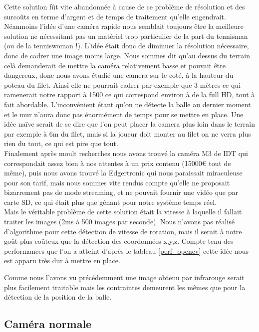 Cette solution fût vite abandonnée à cause de ce problème de résolution et des surcoûts en terme d'argent et de temps de traitement qu'elle engendrait. Néanmoins l'idée d'une caméra rapide nous semblait toujours être la meilleure solution ne nécessitant pas un matériel trop particulier de la part du tennisman (ou de la tenniswoman !). L'idée était donc de diminuer la résolution nécessaire, donc de cadrer une image moins large. Nous sommes dit qu'au dessus du terrain celà demanderait de mettre la caméra relativement basse et pouvait être dangereux, donc nous avons étudié une camera sur le coté, à la hauteur du poteau du filet. Ainsi elle ne pourrait cadrer par exemple que 3 mètres ce qui ramenerait notre rapport à 1500 ce qui correspond environ à de la full HD, tout à fait abordable. L'inconvénient étant qu'on ne détecte la balle au dernier moment et le mur n'aura donc pas énormément de temps pour se mettre en place. Une idée naïve serait de se dire que l'on peut placer la camera plus loin dans le terrain par exemple à 6m du filet, mais si la joueur doit monter au filet on ne verra plus rien du tout, ce qui est pire que tout.\\

Finalement après moult recherches nous avons trouvé la caméra M3 de IDT qui correspondait assez bien à nos attentes à un prix contenu (15000€ tout de même), puis nous avons trouvé la Edgertronic qui nous paraissait miraculeuse pour son tarif, mais nous sommes vite rendus compte qu'elle ne proposait bizarrement pas de mode streaming, et ne pouvait fournir une vidéo que par carte SD, ce qui était plus que gênant pour notre système temps réel.\\

Mais le véritable problème de cette solution était la vitesse à laquelle il fallait traiter les images (2ms à 500 images par seconde). Nous n'avons pas réalisé d'algorithme pour cette détection de vitesse de rotation, mais il serait à notre goût plus coûteux que la détection des coordonnées x,y,z. Compte tenu des performances que l'on a atteint d'après le tableau \ref{perf_opencv} cette idée nous est apparu très dur à mettre en place.


Comme nous l'avons vu précédemment une image obtenu par infrarouge serait plus facilement traitable mais les contraintes demeurent les mêmes que pour la détection de la position de la balle.





\subsection{Caméra normale}

